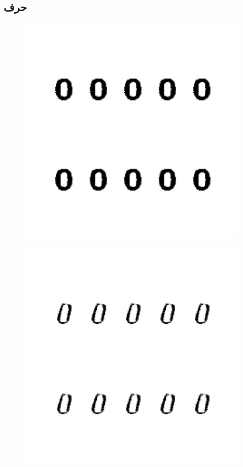 \documentclass{article}
\begin{document}
\subsection{حرف }
\begin{figure}[H]
	\centerline{\includegraphics[width=\textwidth , height=\textheight ]{../results/CGAN_Adam/figs/letters/O/95.pdf}}
\end{figure}
\begin{figure}[H]
	\centerline{\includegraphics[width=\textwidth , height=\textheight ]{../results/CGAN_Adam/figs/letters/O/90.pdf}}
\end{figure}
\end{document}

